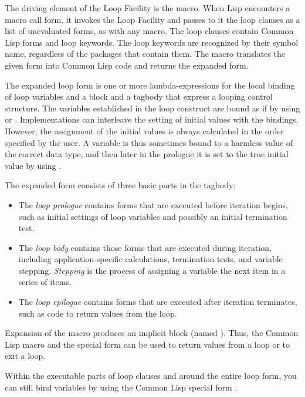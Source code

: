 The driving element of the Loop Facility is the  macro.
When Lisp encounters a  macro call
form, it invokes the Loop Facility and passes to it the loop clauses
as a list of unevaluated forms, as with any macro.
The loop clauses contain Common Lisp forms and loop keywords.  The
loop keywords are recognized by their symbol name, regardless of the
packages that contain them.  The  macro translates the
given form into Common Lisp code and returns the expanded form.

The expanded loop form is
one or more lambda-expressions for the local binding of loop variables
and a block and a tagbody that express a looping control structure.   
  The variables established in the loop construct are bound as
  if by using  or .  Implementations can interleave the
  setting of initial values with the bindings.  However, the assignment
  of the initial values is always calculated in the order specified by
  the user.  A variable is thus sometimes bound to a harmless value of the
  correct data type, and then later in the prologue it is set to the true
  initial value by using .

The expanded form consists of three basic parts in the tagbody:

\begin{itemize}
\item
The {\it loop prologue\/} contains forms that are executed before iteration begins, 
such as initial settings of loop variables and possibly an initial
termination test.

\item
The {\it loop body\/}  contains those forms that are executed during iteration, 
including application-specific calculations, termination tests,
and variable stepping.  {\it Stepping\/} is the process of assigning a
variable the next item in a series of items.

\item
The {\it loop epilogue} contains forms that are executed after iteration 
terminates,
such as code to return values from the loop.
\end{itemize}


Expansion of the  macro produces an implicit block 
(named ).
Thus, the Common Lisp macro  and the special form 
 can be 
used to return values from a loop or to exit a loop.

  Within the executable parts of loop clauses and around the entire
  loop form, you can still bind variables by using the Common Lisp
  special form .



